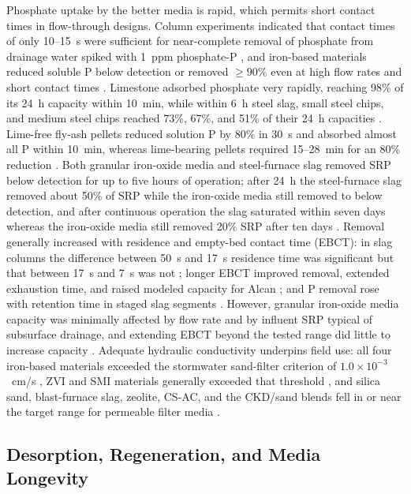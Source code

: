 Phosphate uptake by the better media is rapid, which permits short contact times
in flow-through designs. Column experiments indicated that contact times of only
10--15~s were sufficient for near-complete removal of phosphate from drainage
water spiked with 1~ppm phosphate-P \parencite{Allred2017}, and iron-based
materials reduced soluble P below detection or removed $\geq 90\%$ even at high
flow rates and short contact times \parencite{Allred2014}. Limestone adsorbed
phosphate very rapidly, reaching 98\% of its 24~h capacity within 10~min, while
within 6~h steel slag, small steel chips, and medium steel chips reached 73\%,
67\%, and 51\% of their 24~h capacities \parencite{Sellner2019b}. Lime-free
fly-ash pellets reduced solution P by 80\% in 30~s and absorbed almost all P
within 10~min, whereas lime-bearing pellets required 15--28~min for an 80\%
reduction \parencite{Li2017}. Both granular iron-oxide media and steel-furnace
slag removed SRP below detection for up to five hours of operation; after 24~h the
steel-furnace slag removed about 50\% of SRP while the iron-oxide media still
removed to below detection, and after continuous operation the slag saturated
within seven days whereas the iron-oxide media still removed 20\% SRP after ten
days \parencite{Hauda2020}. Removal generally increased with residence and
empty-bed contact time (EBCT): in slag columns the difference between 50~s and
17~s residence time was significant but that between 17~s and 7~s was not
\parencite{Sanford2016}; longer EBCT improved removal, extended exhaustion time,
and raised modeled capacity for Alcan \parencite{Kumari2025}; and P removal rose
with retention time in staged slag segments \parencite{Wang2020d}. However,
granular iron-oxide media capacity was minimally affected by flow rate and by
influent SRP typical of subsurface drainage, and extending EBCT beyond the tested
range did little to increase capacity \parencite{Hauda2020}. Adequate hydraulic
conductivity underpins field use: all four iron-based materials exceeded the
stormwater sand-filter criterion of $1.0\times10^{-3}$~cm/s
\parencite{Allred2014}, ZVI and SMI materials generally exceeded that threshold
\parencite{Allred2012}, and silica sand, blast-furnace slag, zeolite, CS-AC, and
the CKD/sand blends fell in or near the target range for permeable filter media
\parencite{Agrawal2011}.

\subsection{Desorption, Regeneration, and Media Longevity}

